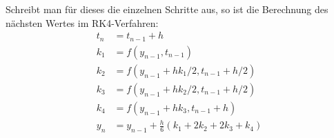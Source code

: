 \documentclass{scrartcl}
\begin{document}
Schreibt man für dieses die einzelnen Schritte aus, so ist die Berechnung des nächsten Wertes im RK4-Verfahren:
\begin{equation}
	\begin{aligned}
		t_n &= t_{n-1} + h \\[0.3cm]
		k_1 &= f\left(y_{n-1}, t_{n-1}\right) \\
		k_2 &= f\left(y_{n-1} + hk_1/2, t_{n-1} + h/2\right) \\
		k_3 &= f\left(y_{n-1} + hk_2/2, t_{n-1} + h/2\right) \\
		k_4 &= f\left(y_{n-1} + hk_3, t_{n-1} + h\right) \\[0.3cm]
		y_n &= y_{n-1} + \tfrac{h}{6}\left(k_1 + 2k_2 + 2k_3 + k_4 \right)
	\end{aligned}
\end{equation}
\newpage
\printbibliography
\end{document}
